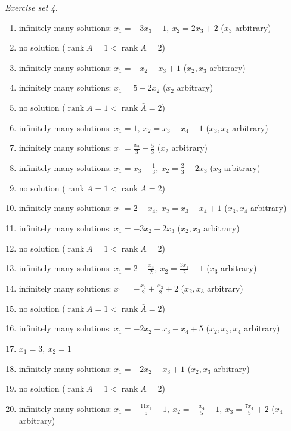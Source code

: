 \par\noindent\emph{Exercise set 4.}\nopagebreak
\begin{enumerate}[label=\arabic*., leftmargin=*, itemsep=1pt]
\item infinitely many solutions: $x_1=- 3 x_{3} - 1,\ x_2=2 x_{3} + 2$ ($x_{3}$ arbitrary)
\item no solution ($\operatorname{rank}A=1<\operatorname{rank}\bar A=2$)
\item infinitely many solutions: $x_1=- x_{2} - x_{3} + 1$ ($x_{2}, x_{3}$ arbitrary)
\item infinitely many solutions: $x_1=5 - 2 x_{2}$ ($x_{2}$ arbitrary)
\item no solution ($\operatorname{rank}A=1<\operatorname{rank}\bar A=2$)
\item infinitely many solutions: $x_1=1,\ x_2=x_{3} - x_{4} - 1$ ($x_{3}, x_{4}$ arbitrary)
\item infinitely many solutions: $x_1=\frac{x_{2}}{3} + \frac{5}{3}$ ($x_{2}$ arbitrary)
\item infinitely many solutions: $x_1=x_{3} - \frac{1}{3},\ x_2=\frac{2}{3} - 2 x_{3}$ ($x_{3}$ arbitrary)
\item no solution ($\operatorname{rank}A=1<\operatorname{rank}\bar A=2$)
\item infinitely many solutions: $x_1=2 - x_{4},\ x_2=x_{3} - x_{4} + 1$ ($x_{3}, x_{4}$ arbitrary)
\item infinitely many solutions: $x_1=- 3 x_{2} + 2 x_{3}$ ($x_{2}, x_{3}$ arbitrary)
\item no solution ($\operatorname{rank}A=1<\operatorname{rank}\bar A=2$)
\item infinitely many solutions: $x_1=2 - \frac{x_{3}}{2},\ x_2=\frac{3 x_{3}}{2} - 1$ ($x_{3}$ arbitrary)
\item infinitely many solutions: $x_1=- \frac{x_{2}}{2} + \frac{x_{3}}{2} + 2$ ($x_{2}, x_{3}$ arbitrary)
\item no solution ($\operatorname{rank}A=1<\operatorname{rank}\bar A=2$)
\item infinitely many solutions: $x_1=- 2 x_{2} - x_{3} - x_{4} + 5$ ($x_{2}, x_{3}, x_{4}$ arbitrary)
\item $x_1=3,\ x_2=1$
\item infinitely many solutions: $x_1=- 2 x_{2} + x_{3} + 1$ ($x_{2}, x_{3}$ arbitrary)
\item no solution ($\operatorname{rank}A=1<\operatorname{rank}\bar A=2$)
\item infinitely many solutions: $x_1=- \frac{11 x_{4}}{5} - 1,\ x_2=- \frac{x_{4}}{5} - 1,\ x_3=\frac{7 x_{4}}{5} + 2$ ($x_{4}$ arbitrary)

\end{enumerate}
